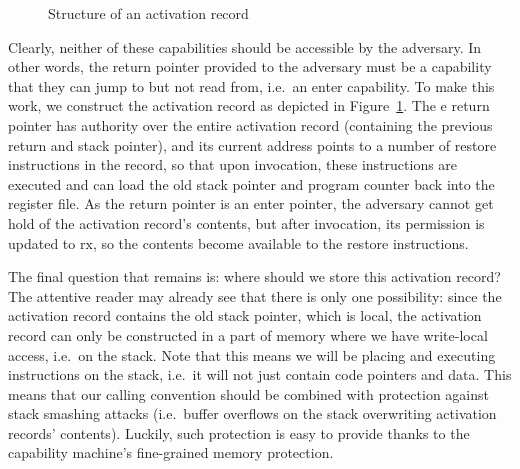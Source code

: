 \documentclass[compsoc,conference,letterpaper,fleqn]{IEEEtran}
\newcommand{\plainperm}[1]{\mathrm{#1}}
\newcommand{\exec}{\plainperm{rx}}
\newcommand{\entry}{\plainperm{e}}
\begin{document}
\begin{figure}
  
  \caption{Structure of an activation record}
  \label{fig:activ-rec-struct}
\end{figure}

Clearly, neither of these capabilities should be accessible by the adversary. In
other words, the return pointer provided to the adversary must be a capability
that they can jump to but not read from, i.e.\ an enter capability. To make this
work, we construct the activation record as depicted in
Figure~\ref{fig:activ-rec-struct}. The $\entry$ return pointer has authority
over the entire activation record (containing the previous return and stack
pointer), and its current address points to a number of restore instructions in
the record, so that upon invocation, these instructions are executed and can
load the old stack pointer and program counter back into the register file. As
the return pointer is an enter pointer, the adversary cannot get hold of the
activation record's contents, but after invocation, its permission is updated to
$\exec$, so the contents become available to the restore instructions.

The final question that remains is: where should we store this activation
record? The attentive reader may already see that there is only one possibility:
since the activation record contains the old stack pointer, which is local, the
activation record can only be constructed in a part of memory where we have
write-local access, i.e.\ on the stack. Note that this means we will be placing
and executing instructions on the stack, i.e.\ it will not just contain code
pointers and data. This means that our calling convention should be combined
with protection against stack smashing attacks (i.e.\ buffer overflows on the
stack overwriting activation records' contents). Luckily, such protection is
easy to provide thanks to the capability machine's fine-grained memory
protection.
\end{document}
